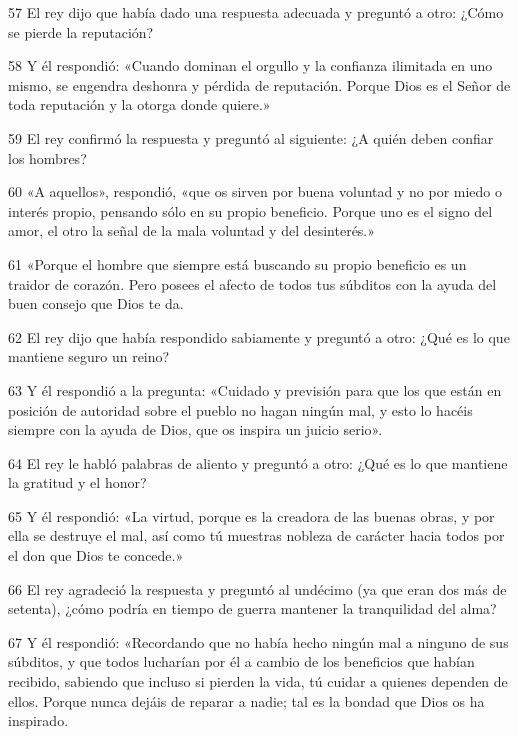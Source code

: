 \par 57 El rey dijo que había dado una respuesta adecuada y preguntó a otro: ¿Cómo se pierde la reputación?

\par 58 Y él respondió: «Cuando dominan el orgullo y la confianza ilimitada en uno mismo, se engendra deshonra y pérdida de reputación. Porque Dios es el Señor de toda reputación y la otorga donde quiere.»

\par 59 El rey confirmó la respuesta y preguntó al siguiente: ¿A quién deben confiar los hombres?

\par 60 «A aquellos», respondió, «que os sirven por buena voluntad y no por miedo o interés propio, pensando sólo en su propio beneficio. Porque uno es el signo del amor, el otro la señal de la mala voluntad y del desinterés.»

\par 61 «Porque el hombre que siempre está buscando su propio beneficio es un traidor de corazón. Pero posees el afecto de todos tus súbditos con la ayuda del buen consejo que Dios te da.

\par 62 El rey dijo que había respondido sabiamente y preguntó a otro: ¿Qué es lo que mantiene seguro un reino?

\par 63 Y él respondió a la pregunta: «Cuidado y previsión para que los que están en posición de autoridad sobre el pueblo no hagan ningún mal, y esto lo hacéis siempre con la ayuda de Dios, que os inspira un juicio serio».

\par 64 El rey le habló palabras de aliento y preguntó a otro: ¿Qué es lo que mantiene la gratitud y el honor?

\par 65 Y él respondió: «La virtud, porque es la creadora de las buenas obras, y por ella se destruye el mal, así como tú muestras nobleza de carácter hacia todos por el don que Dios te concede.»

\par 66 El rey agradeció la respuesta y preguntó al undécimo (ya que eran dos más de setenta), ¿cómo podría en tiempo de guerra mantener la tranquilidad del alma?

\par 67 Y él respondió: «Recordando que no había hecho ningún mal a ninguno de sus súbditos, y que todos lucharían por él a cambio de los beneficios que habían recibido, sabiendo que incluso si pierden la vida, tú cuidar a quienes dependen de ellos. Porque nunca dejáis de reparar a nadie; tal es la bondad que Dios os ha inspirado.

